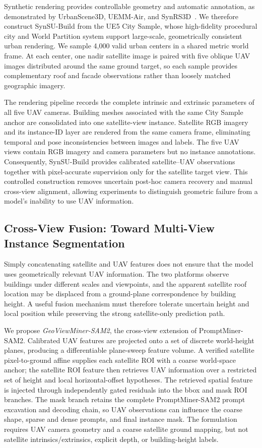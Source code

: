 \documentclass[letterpaper,journal]{IEEEtran}
\begin{document}
Synthetic rendering provides controllable geometry and automatic annotation, as demonstrated by UrbanScene3D, UEMM-Air, and SynRS3D~\cite{ref_urbanscene3d,ref_uemmair,ref_synrs3d}. We therefore construct SynSU-Build from the UE5 City Sample, whose high-fidelity procedural city and World Partition system support large-scale, geometrically consistent urban rendering. We sample 4,000 valid urban centers in a shared metric world frame. At each center, one nadir satellite image is paired with five oblique UAV images distributed around the same ground target, so each sample provides complementary roof and facade observations rather than loosely matched geographic imagery.

The rendering pipeline records the complete intrinsic and extrinsic parameters of all five UAV cameras. Building meshes associated with the same City Sample anchor are consolidated into one satellite-view instance. Satellite RGB imagery and its instance-ID layer are rendered from the same camera frame, eliminating temporal and pose inconsistencies between images and labels. The five UAV views contain RGB imagery and camera parameters but no instance annotations. Consequently, SynSU-Build provides calibrated satellite--UAV observations together with pixel-accurate supervision only for the satellite target view. This controlled construction removes uncertain post-hoc camera recovery and manual cross-view alignment, allowing experiments to distinguish geometric failure from a model's inability to use UAV information.

\subsection{Cross-View Fusion: Toward Multi-View Instance Segmentation}
Simply concatenating satellite and UAV features does not ensure that the model uses geometrically relevant UAV information. The two platforms observe buildings under different scales and viewpoints, and the apparent satellite roof location may be displaced from a ground-plane correspondence by building height. A useful fusion mechanism must therefore tolerate uncertain height and local position while preserving the strong satellite-only prediction path.

We propose \emph{GeoViewMiner-SAM2}, the cross-view extension of PromptMiner-SAM2. Calibrated UAV features are projected onto a set of discrete world-height planes, producing a differentiable plane-sweep feature volume. A verified satellite pixel-to-ground affine supplies each satellite ROI with a coarse world-space anchor; the satellite ROI feature then retrieves UAV information over a restricted set of height and local horizontal-offset hypotheses. The retrieved spatial feature is injected through independently gated residuals into the bbox and mask ROI branches. The mask branch retains the complete PromptMiner-SAM2 prompt excavation and decoding chain, so UAV observations can influence the coarse shape, sparse and dense prompts, and final instance mask. The formulation requires UAV camera geometry and a coarse satellite ground mapping, but not satellite intrinsics/extrinsics, explicit depth, or building-height labels.
\end{document}
